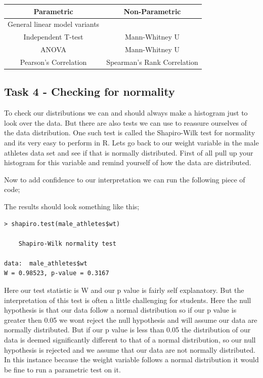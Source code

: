 \documentclass[
]{book}
\newenvironment{Shaded}{\begin{snugshade}}{\end{snugshade}}
\newcommand{\CommentTok}[1]{\textcolor[rgb]{0.56,0.35,0.01}{\textit{#1}}}
\newcommand{\FunctionTok}[1]{\textcolor[rgb]{0.13,0.29,0.53}{\textbf{#1}}}
\newcommand{\NormalTok}[1]{#1}
\newcommand{\SpecialCharTok}[1]{\textcolor[rgb]{0.81,0.36,0.00}{\textbf{#1}}}
\begin{document}
\begin{longtable}[]{@{}cc@{}}
\toprule\noalign{}
Parametric & Non-Parametric \\
\midrule\noalign{}
\endhead
\bottomrule\noalign{}
\endlastfoot
General linear model variants & \\
Independent T-test & Mann-Whitney U \\
ANOVA & Mann-Whitney U \\
Pearson's Correlation & Spearman's Rank Correlation \\
\end{longtable}

\subsection{Task 4 - Checking for normality}\label{task-4---checking-for-normality}

To check our distributions we can and should always make a histogram just to look over the data. But there are also tests we can use to reassure ourselves of the data distribution. One such test is called the Shapiro-Wilk test for normality and its very easy to perform in R. Lets go back to our weight variable in the male athletes data set and see if that is normally distributed. First of all pull up your histogram for this variable and remind yourself of how the data are distributed.

Now to add confidence to our interpretation we can run the following piece of code;

\begin{Shaded}
\end{Shaded}

The results should look something like this;

\begin{verbatim}
> shapiro.test(male_athletes$wt)

    Shapiro-Wilk normality test

data:  male_athletes$wt
W = 0.98523, p-value = 0.3167
\end{verbatim}

Here our test statistic is W and our p value is fairly self explanatory. But the interpretation of this test is often a little challenging for students. Here the null hypothesis is that our data follow a normal distribution so if our p value is greater then 0.05 we wont reject the null hypothesis and will assume our data are normally distributed. But if our p value is less than 0.05 the distribution of our data is deemed significantly different to that of a normal distribution, so our null hypothesis is rejected and we assume that our data are not normally distributed. In this instance because the weight variable follows a normal distribution it would be fine to run a parametric test on it.
\end{document}
